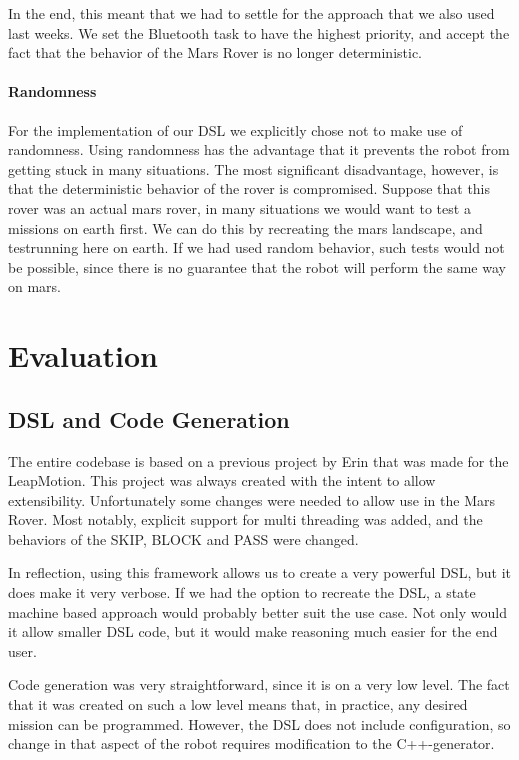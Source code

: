 \documentclass{scrartcl}
\begin{document}
In the end, this meant that we had to settle for the approach that we also used last weeks.
We set the Bluetooth task to have the highest priority, and accept the fact that the behavior of the Mars Rover is no longer deterministic.

\paragraph{Randomness}
For the implementation of our DSL we explicitly chose not to make use of randomness.
Using randomness has the advantage that it prevents the robot from getting stuck in many situations.
The most significant disadvantage, however, is that the deterministic behavior of the rover is compromised.
Suppose that this rover was an actual mars rover, in many situations we would want to test a missions on earth first.
We can do this by recreating the mars landscape, and testrunning here on earth.
If we had used random behavior, such tests would not be possible, since there is no guarantee that the robot will perform the same way on mars.

\section{Evaluation}
\subsection{DSL and Code Generation}
The entire codebase is based on a previous project by Erin that was made for the LeapMotion.
This project was always created with the intent to allow extensibility.
Unfortunately some changes were needed to allow use in the Mars Rover.
Most notably, explicit support for multi threading was added, and the behaviors of the SKIP, BLOCK and PASS were changed.

In reflection, using this framework allows us to create a very powerful DSL, but it does make it very verbose.
If we had the option to recreate the DSL, a state machine based approach would probably better suit the use case.
Not only would it allow smaller DSL code, but it would make reasoning much easier for the end user.

Code generation was very straightforward, since it is on a very low level.
The fact that it was created on such a low level means that, in practice, any desired mission can be programmed.
However, the DSL does not include configuration, so change in that aspect of the robot requires modification to the C++-generator.
\end{document}
